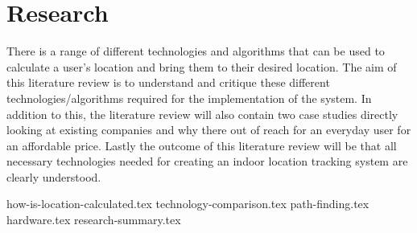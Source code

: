 
\section{Research}
There is a range of different technologies and algorithms that can be used to calculate a user’s location and bring them to their desired location. The aim of this literature review is to understand and critique these different technologies/algorithms required for the implementation of the system. In addition to this, the literature review will also contain two case studies directly looking at existing companies and why there out of reach for an everyday user for an affordable price. Lastly the outcome of this literature review will be that all necessary technologies needed for creating an indoor location tracking system are clearly understood. 
		
{how-is-location-calculated.tex}
{technology-comparison.tex}
{path-finding.tex}
{hardware.tex}
{research-summary.tex}
		